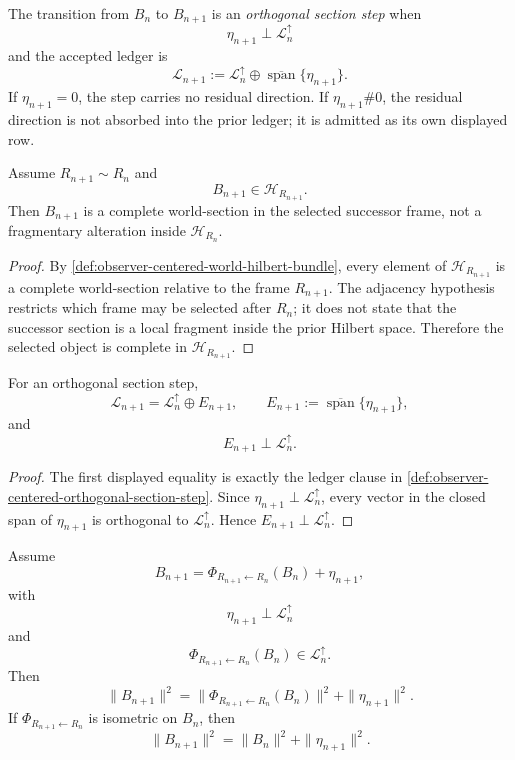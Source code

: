 \begin{definition}
\label{def:observer-centered-orthogonal-section-step}
The transition from $B_n$ to $B_{n+1}$ is an
\emph{orthogonal section step} when
$$
\eta_{n+1}\perp\mathcal L_n^{\uparrow}
$$
and the accepted ledger is
$$
\mathcal L_{n+1}
:=
\mathcal L_n^{\uparrow}
\oplus
\overline{\operatorname{span}}\{\eta_{n+1}\}.
$$
If $\eta_{n+1}=0$, the step carries no residual direction. If
$\eta_{n+1}\#0$, the residual direction is not absorbed into the prior
ledger; it is admitted as its own displayed row.
\end{definition}

\begin{theorem}
\label{thm:observer-centered-adjacent-selection-complete-section}
Assume $R_{n+1}\sim R_n$ and
$$
B_{n+1}\in\mathcal H_{R_{n+1}}.
$$
Then $B_{n+1}$ is a complete world-section in the selected successor
frame, not a fragmentary alteration inside $\mathcal H_{R_n}$.
\end{theorem}

\begin{proof}
By \autoref{def:observer-centered-world-hilbert-bundle}, every element of
$\mathcal H_{R_{n+1}}$ is a complete world-section relative to the frame
$R_{n+1}$. The adjacency hypothesis restricts which frame may be selected
after $R_n$; it does not state that the successor section is a local
fragment inside the prior Hilbert space. Therefore the selected object is
complete in $\mathcal H_{R_{n+1}}$.
\end{proof}

\begin{theorem}
\label{thm:observer-centered-orthogonal-ledger-decomposition}
For an orthogonal section step,
$$
\mathcal L_{n+1}
=
\mathcal L_n^{\uparrow}
\oplus
E_{n+1},
\qquad
E_{n+1}:=
\overline{\operatorname{span}}\{\eta_{n+1}\},
$$
and
$$
E_{n+1}\perp\mathcal L_n^{\uparrow}.
$$
\end{theorem}

\begin{proof}
The first displayed equality is exactly the ledger clause in
\autoref{def:observer-centered-orthogonal-section-step}. Since
$\eta_{n+1}\perp\mathcal L_n^{\uparrow}$, every vector in the closed span
of $\eta_{n+1}$ is orthogonal to $\mathcal L_n^{\uparrow}$. Hence
$E_{n+1}\perp\mathcal L_n^{\uparrow}$.
\end{proof}

\begin{corollary}
\label{cor:observer-centered-pythagorean-rewritten-section}
Assume
$$
B_{n+1}
=
\Phi_{R_{n+1}\leftarrow R_n}(B_n)+\eta_{n+1},
$$
with
$$
\eta_{n+1}\perp\mathcal L_n^{\uparrow}
$$
and
$$
\Phi_{R_{n+1}\leftarrow R_n}(B_n)\in\mathcal L_n^{\uparrow}.
$$
Then
$$
\|B_{n+1}\|^2
=
\|\Phi_{R_{n+1}\leftarrow R_n}(B_n)\|^2
+
\|\eta_{n+1}\|^2.
$$
If $\Phi_{R_{n+1}\leftarrow R_n}$ is isometric on $B_n$, then
$$
\|B_{n+1}\|^2
=
\|B_n\|^2+\|\eta_{n+1}\|^2.
$$
\end{corollary}

